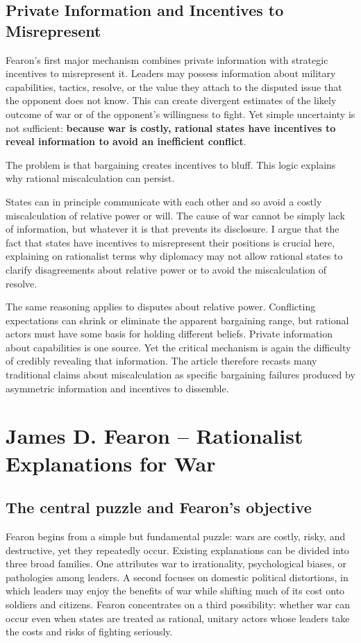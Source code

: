 \subsection{Private Information and Incentives to Misrepresent}
Fearon's first major mechanism combines private information with strategic incentives to misrepresent it. Leaders may possess information about military capabilities, tactics, resolve, or the value they attach to the disputed issue that the opponent does not know. This can create divergent estimates of the likely outcome of war or of the opponent's willingness to fight. Yet simple uncertainty is not sufficient: \textbf{because war is costly, rational states have incentives to reveal information to avoid an inefficient conflict}.

The problem is that bargaining creates incentives to bluff. This logic explains why rational miscalculation can persist.

States can in principle communicate with each other and so avoid a costly miscalculation of relative power or will. The cause of war cannot be simply lack of information, but whatever it is that prevents its disclosure. I argue that the fact that states have incentives to misrepresent their positions is crucial here, explaining on rationalist terms why diplomacy may not allow rational states to clarify disagreements about relative power or to avoid the miscalculation of resolve.

The same reasoning applies to disputes about relative power. Conflicting expectations can shrink or eliminate the apparent bargaining range, but rational actors must have some basis for holding different beliefs. Private information about capabilities is one source. Yet the critical mechanism is again the difficulty of credibly revealing that information. The article therefore recasts many traditional claims about miscalculation as specific bargaining failures produced by asymmetric information and incentives to dissemble.

\section{James D. Fearon -- Rationalist Explanations for War}
\subsection{The central puzzle and Fearon's objective}
Fearon begins from a simple but fundamental puzzle: wars are costly, risky, and destructive, yet they repeatedly occur. Existing explanations can be divided into three broad families. One attributes war to irrationality, psychological biases, or pathologies among leaders. A second focuses on domestic political distortions, in which leaders may enjoy the benefits of war while shifting much of its cost onto soldiers and citizens. Fearon concentrates on a third possibility: whether war can occur even when states are treated as rational, unitary actors whose leaders take the costs and risks of fighting seriously.


